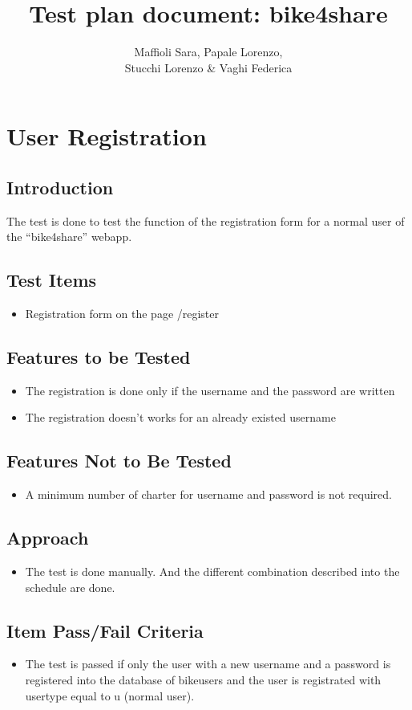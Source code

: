 \documentclass{article}
\title{Test plan document: bike4share}
\author{Maffioli Sara, Papale Lorenzo, \\ Stucchi Lorenzo \& Vaghi Federica}
\begin{document}
\maketitle
\tableofcontents

\newpage

\section{User Registration}
\subsection{Introduction}
The test is done to test the function of the registration form for a normal user of the “bike4share” webapp.
\subsection{Test Items}
\begin{itemize}
    \item Registration form on the page /register
\end{itemize}
\subsection{Features to be Tested}
\begin{itemize}
    \item The registration is done only if the username and the password are written
    \item The registration doesn’t works for an already existed username
\end{itemize}
\subsection{Features Not to Be Tested}
\begin{itemize}
    \item A minimum number of charter for username and password is not required. 
\end{itemize}
\subsection{Approach}
\begin{itemize}
    \item The test is done manually. And the different combination described into the schedule are done. 
\end{itemize}
\subsection{Item Pass/Fail Criteria}
\begin{itemize}
    \item The test is passed if only the user with a new username and a password is registered into the database of bike\textunderscore users and the user is registrated with user\textunderscore type equal to u (normal user). 
\end{itemize}
\end{document}
